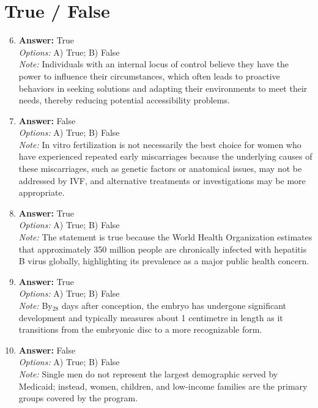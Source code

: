 \documentclass[12pt]{article}
\begin{document}
\section*{True / False}
\begin{enumerate}[label=\arabic*.]
\setcounter{enumi}{5}
\item \textbf{Answer:} True
\\ \textit{Options:} A) True; B) False
\\ \textit{Note:} Individuals with an internal locus of control believe they have the power to influence their circumstances, which often leads to proactive behaviors in seeking solutions and adapting their environments to meet their needs, thereby reducing potential accessibility problems.
\item \textbf{Answer:} False
\\ \textit{Options:} A) True; B) False
\\ \textit{Note:} In vitro fertilization is not necessarily the best choice for women who have experienced repeated early miscarriages because the underlying causes of these miscarriages, such as genetic factors or anatomical issues, may not be addressed by IVF, and alternative treatments or investigations may be more appropriate.
\item \textbf{Answer:} True
\\ \textit{Options:} A) True; B) False
\\ \textit{Note:} The statement is true because the World Health Organization estimates that approximately 350 million people are chronically infected with hepatitis B virus globally, highlighting its prevalence as a major public health concern.
\item \textbf{Answer:} True
\\ \textit{Options:} A) True; B) False
\\ \textit{Note:} By$_{28}$ days after conception, the embryo has undergone significant development and typically measures about 1 centimetre in length as it transitions from the embryonic disc to a more recognizable form.
\item \textbf{Answer:} False
\\ \textit{Options:} A) True; B) False
\\ \textit{Note:} Single men do not represent the largest demographic served by Medicaid; instead, women, children, and low-income families are the primary groups covered by the program.
\end{enumerate}
\end{document}
